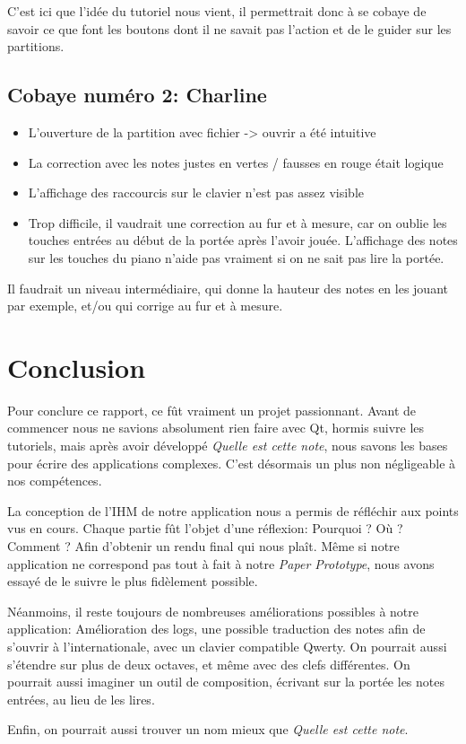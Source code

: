 \documentclass{article}
\begin{document}
C'est ici que l'idée du tutoriel nous vient, il permettrait donc à se cobaye de savoir ce que font les boutons dont il ne savait pas
l'action et de le guider sur les partitions.

\subsection{Cobaye numéro 2: Charline}

\begin{itemize}
\item L'ouverture de la partition avec fichier -> ouvrir a été intuitive
\item La correction avec les notes justes en vertes / fausses en rouge était logique
\item L'affichage des raccourcis sur le clavier n'est pas assez visible
\item Trop difficile, il vaudrait une correction au fur et à mesure, car on oublie les touches entrées au début de la portée après l'avoir jouée. L'affichage des notes sur les touches du piano n'aide pas vraiment si on ne sait pas lire la portée. 
\end{itemize}

Il faudrait un niveau intermédiaire, qui donne la hauteur des notes en les jouant par exemple, et/ou qui corrige au fur et à mesure.

\section{Conclusion}
Pour conclure ce rapport, ce fût vraiment un projet passionnant. Avant de commencer nous ne savions absolument rien faire avec Qt, hormis suivre les tutoriels, mais après avoir développé \emph{Quelle est cette note}, nous savons les bases pour écrire des applications complexes. C'est désormais un plus non négligeable à nos compétences. 

La conception de l'IHM de notre application nous a permis de réfléchir aux points vus en cours. Chaque partie fût l'objet d'une réflexion: Pourquoi ? Où ? Comment ? Afin d'obtenir un rendu final qui nous plaît. Même si notre application ne correspond pas tout à fait à notre \emph{Paper Prototype}, nous avons essayé de le suivre le plus fidèlement possible. 

Néanmoins, il reste toujours de nombreuses améliorations possibles à notre application: Amélioration des logs, une possible traduction des notes afin de s'ouvrir à l'internationale, avec un clavier compatible Qwerty. On pourrait aussi s'étendre sur plus de deux octaves, et même avec des clefs différentes. On pourrait aussi imaginer un outil de composition, écrivant sur la portée les notes entrées, au lieu de les lires. 

Enfin, on pourrait aussi trouver un nom mieux que \emph{Quelle est cette note}.
\end{document}
